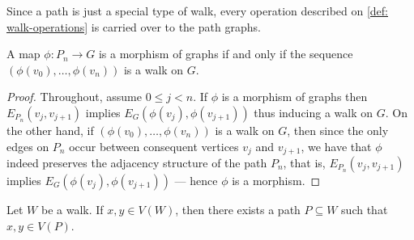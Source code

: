 Since a path is just a special type of walk, every operation described on
\cref{def: walk-operations} is carried over to the path graphs.

\begin{proposition}
  \label{prop: morphism-path-walk}
  A map \(\phi: P_n \to G\) is a morphism of graphs if and only if the sequence
  \((\phi(v_0), \dots, \phi(v_n))\) is a walk on \(G\).
\end{proposition}

\begin{proof}
  Throughout, assume \(0 \leq j < n\). If \(\phi\) is a morphism of graphs then
  \(E_{P_n}(v_j, v_{j + 1})\) implies \(E_G(\phi(v_j), \phi(v_{j+1}))\) thus
  inducing a walk on \(G\). On the other hand, if \((\phi(v_0), \dots,
  \phi(v_n))\) is a walk on \(G\), then since the only edges on \(P_n\) occur
  between consequent vertices \(v_j\) and \(v_{j+1}\), we have that \(\phi\)
  indeed preserves the adjacency structure of the path \(P_n\), that is,
  \(E_{P_n}(v_j, v_{j+1})\) implies \(E_G(\phi(v_j), \phi(v_{j+1}))\) --- hence
  \(\phi\) is a morphism.
\end{proof}

\begin{lemma}\label{lem: paths-on-walks}
  Let \(W\) be a walk. If \(x, y \in V(W)\), then there exists a path \(P
  \subseteq W\) such that \(x, y \in V(P)\).
\end{lemma}


